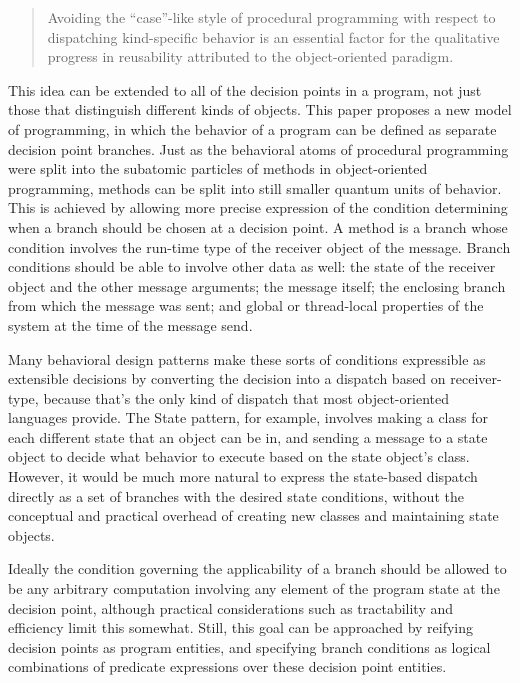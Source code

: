 \documentclass{article}
\begin{document}
\begin{quote}
Avoiding the ``case''-like style of procedural programming with
respect to dispatching kind-specific behavior is an essential factor
for the qualitative progress in reusability attributed to the
object-oriented paradigm.
\end{quote}

This idea can be extended to all of the decision points in a program,
not just those that distinguish different kinds of objects.  This
paper proposes a new model of programming, in which the behavior of a
program can be defined as separate decision point branches.
Just as the behavioral atoms of procedural programming were split into
the subatomic particles of methods in object-oriented programming,
methods can be split into still smaller quantum units of behavior.
This is achieved by allowing more precise expression of the condition
determining when a branch should be chosen at a decision point.  A method
is a branch whose condition involves the run-time type of the receiver
object of the message.  Branch conditions should be able to involve
other data as well: the state of the receiver object and the other
message arguments; the message itself; the enclosing branch from which
the message was sent; and global or thread-local properties of the
system at the time of the message send.

Many behavioral design patterns \cite{gamma94design} make these
sorts of conditions expressible as extensible decisions by
converting the decision into a dispatch based on receiver-type,
because that's the only kind of dispatch that most object-oriented
languages provide.  The State pattern, for example, involves making a
class for each different state that an object can be in, and sending a
message to a state object to decide what behavior to execute based on
the state object's class.  However, it would be much more natural to
express the state-based dispatch directly as a set of branches with
the desired state conditions, without the conceptual and practical
overhead of creating new classes and maintaining state objects.

Ideally the condition governing the applicability of a branch should
be allowed to be any arbitrary computation involving any element of
the program state at the decision point, although practical
considerations such as tractability and efficiency limit this
somewhat.  Still, this goal can be approached by reifying decision
points as program entities, and specifying branch conditions as
logical combinations of predicate expressions over these decision
point entities.
\end{document}
